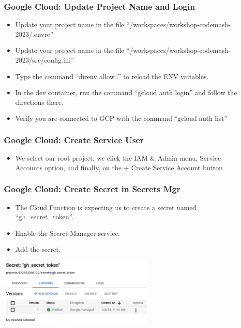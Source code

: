 \documentclass[aspectratio=169]{beamer}
\begin{document}
\begin{frame}
	\frametitle{Google Cloud: Update Project Name and Login}
	\begin{itemize}
		\item Update your project name in the file ``/workspaces/workshop-codemash-2023/.envrc''
		\item Update your project name in the file ``/workspaces/workshop-codemash-2023/src/config.ini''
		\item Type the command ``direnv allow .'' to reload the ENV variables.
		\item In the dev container, run the command ``gcloud auth login'' and follow the directions there.
		\item Verify you are connected to GCP with the command ``gcloud auth list''
	\end{itemize}
\end{frame}

\begin{frame}
	\frametitle{Google Cloud: Create Service User}
	\begin{itemize}
		\item We select our root project, we click the IAM \& Admin menu, Service Accounts option, and finally, on the + Create Service Account button.
	\end{itemize}
\end{frame}

\begin{frame}
	\frametitle{Google Cloud: Create Secret in Secrets Mgr}

	\begin{itemize}
		\item The Cloud Function is expecting us to create a secret named ``gh\_secret\_token''.
		\item Enable the Secret Manager service.
		\item Add the secret.
	\end{itemize}
	\begin{center}
		\includegraphics[width=0.585\textwidth]{../images/gcp-secret.png}
	\end{center}
\end{frame}
\end{document}
